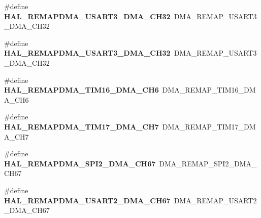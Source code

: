 \begin{DoxyCompactItemize}
\item 
\hypertarget{group___h_a_l___d_m_a___aliased___defines_ga79d86fdf916efa7463e359ac4a404e29}{\#define {\bfseries H\-A\-L\-\_\-\-R\-E\-M\-A\-P\-D\-M\-A\-\_\-\-U\-S\-A\-R\-T3\-\_\-\-D\-M\-A\-\_\-\-C\-H32}~D\-M\-A\-\_\-\-R\-E\-M\-A\-P\-\_\-\-U\-S\-A\-R\-T3\-\_\-\-D\-M\-A\-\_\-\-C\-H32}\label{group___h_a_l___d_m_a___aliased___defines_ga79d86fdf916efa7463e359ac4a404e29}

\item 
\hypertarget{group___h_a_l___d_m_a___aliased___defines_ga79d86fdf916efa7463e359ac4a404e29}{\#define {\bfseries H\-A\-L\-\_\-\-R\-E\-M\-A\-P\-D\-M\-A\-\_\-\-U\-S\-A\-R\-T3\-\_\-\-D\-M\-A\-\_\-\-C\-H32}~D\-M\-A\-\_\-\-R\-E\-M\-A\-P\-\_\-\-U\-S\-A\-R\-T3\-\_\-\-D\-M\-A\-\_\-\-C\-H32}\label{group___h_a_l___d_m_a___aliased___defines_ga79d86fdf916efa7463e359ac4a404e29}

\item 
\hypertarget{group___h_a_l___d_m_a___aliased___defines_ga982538686481944a0bb7277321303bee}{\#define {\bfseries H\-A\-L\-\_\-\-R\-E\-M\-A\-P\-D\-M\-A\-\_\-\-T\-I\-M16\-\_\-\-D\-M\-A\-\_\-\-C\-H6}~D\-M\-A\-\_\-\-R\-E\-M\-A\-P\-\_\-\-T\-I\-M16\-\_\-\-D\-M\-A\-\_\-\-C\-H6}\label{group___h_a_l___d_m_a___aliased___defines_ga982538686481944a0bb7277321303bee}

\item 
\hypertarget{group___h_a_l___d_m_a___aliased___defines_ga5ff091f7f81537b41fe4bac1d0f7918b}{\#define {\bfseries H\-A\-L\-\_\-\-R\-E\-M\-A\-P\-D\-M\-A\-\_\-\-T\-I\-M17\-\_\-\-D\-M\-A\-\_\-\-C\-H7}~D\-M\-A\-\_\-\-R\-E\-M\-A\-P\-\_\-\-T\-I\-M17\-\_\-\-D\-M\-A\-\_\-\-C\-H7}\label{group___h_a_l___d_m_a___aliased___defines_ga5ff091f7f81537b41fe4bac1d0f7918b}

\item 
\hypertarget{group___h_a_l___d_m_a___aliased___defines_ga6376d9fb648c5df3bbd41746b98cb986}{\#define {\bfseries H\-A\-L\-\_\-\-R\-E\-M\-A\-P\-D\-M\-A\-\_\-\-S\-P\-I2\-\_\-\-D\-M\-A\-\_\-\-C\-H67}~D\-M\-A\-\_\-\-R\-E\-M\-A\-P\-\_\-\-S\-P\-I2\-\_\-\-D\-M\-A\-\_\-\-C\-H67}\label{group___h_a_l___d_m_a___aliased___defines_ga6376d9fb648c5df3bbd41746b98cb986}

\item 
\hypertarget{group___h_a_l___d_m_a___aliased___defines_gad932cab9ecf9c8d136b8421d8506a270}{\#define {\bfseries H\-A\-L\-\_\-\-R\-E\-M\-A\-P\-D\-M\-A\-\_\-\-U\-S\-A\-R\-T2\-\_\-\-D\-M\-A\-\_\-\-C\-H67}~D\-M\-A\-\_\-\-R\-E\-M\-A\-P\-\_\-\-U\-S\-A\-R\-T2\-\_\-\-D\-M\-A\-\_\-\-C\-H67}\label{group___h_a_l___d_m_a___aliased___defines_gad932cab9ecf9c8d136b8421d8506a270}


\end{DoxyCompactItemize}
